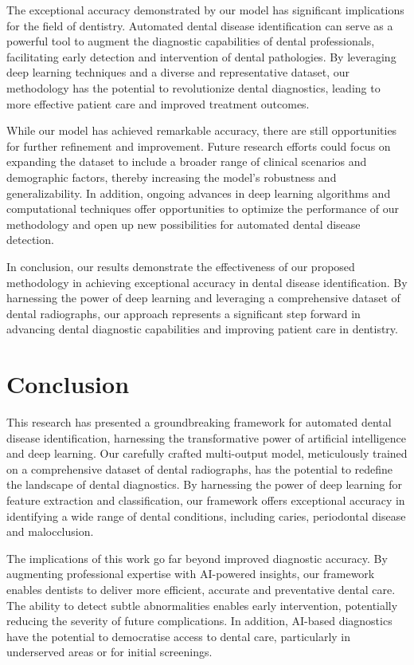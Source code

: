\documentclass[journal,twoside,web]{ieeecolor}
\begin{document}
The exceptional accuracy demonstrated by our model has significant implications for the field of dentistry. Automated dental disease identification can serve as a powerful tool to augment the diagnostic capabilities of dental professionals, facilitating early detection and intervention of dental pathologies. By leveraging deep learning techniques and a diverse and representative dataset, our methodology has the potential to revolutionize dental diagnostics, leading to more effective patient care and improved treatment outcomes.

While our model has achieved remarkable accuracy, there are still opportunities for further refinement and improvement. Future research efforts could focus on expanding the dataset to include a broader range of clinical scenarios and demographic factors, thereby increasing the model's robustness and generalizability. In addition, ongoing advances in deep learning algorithms and computational techniques offer opportunities to optimize the performance of our methodology and open up new possibilities for automated dental disease detection.

In conclusion, our results demonstrate the effectiveness of our proposed methodology in achieving exceptional accuracy in dental disease identification. By harnessing the power of deep learning and leveraging a comprehensive dataset of dental radiographs, our approach represents a significant step forward in advancing dental diagnostic capabilities and improving patient care in dentistry.

\section{Conclusion}
This research has presented a groundbreaking framework for automated dental disease identification, harnessing the transformative power of artificial intelligence and deep learning. Our carefully crafted multi-output model, meticulously trained on a comprehensive dataset of dental radiographs, has the potential to redefine the landscape of dental diagnostics. By harnessing the power of deep learning for feature extraction and classification, our framework offers exceptional accuracy in identifying a wide range of dental conditions, including caries, periodontal disease and malocclusion.

The implications of this work go far beyond improved diagnostic accuracy. By augmenting professional expertise with AI-powered insights, our framework enables dentists to deliver more efficient, accurate and preventative dental care. The ability to detect subtle abnormalities enables early intervention, potentially reducing the severity of future complications. In addition, AI-based diagnostics have the potential to democratise access to dental care, particularly in underserved areas or for initial screenings.
\end{document}
